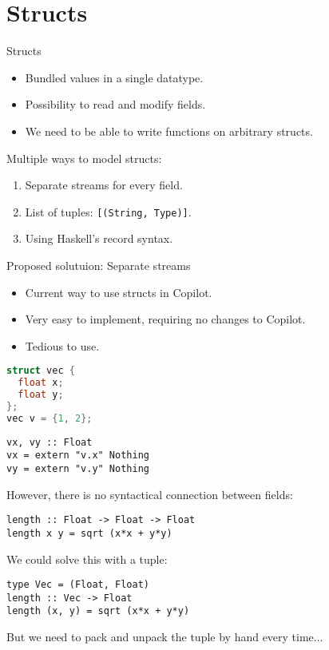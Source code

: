 \documentclass{beamer}
\begin{document}
\section{Structs}
\begin{frame}{Structs}
  \begin{itemize}
    \item Bundled values in a single datatype.
    \item Possibility to read and modify fields.
    \item We need to be able to write functions on arbitrary structs.
  \end{itemize}

  Multiple ways to model structs:
    \begin{enumerate}
      \item Separate streams for every field.
      \item List of tuples: \texttt{[(String, Type)]}.
      \item Using Haskell's record syntax.
    \end{enumerate}
\end{frame}



\begin{frame}[fragile]{Proposed solutuion: Separate streams}
  \begin{itemize}
    \item Current way to use structs in Copilot.
    \item Very easy to implement, requiring no changes to Copilot.
    \item Tedious to use.
  \end{itemize}
\begin{lstlisting}[language=c]
struct vec {
  float x;
  float y;
};
vec v = {1, 2};
\end{lstlisting}
\begin{lstlisting}
vx, vy :: Float
vx = extern "v.x" Nothing
vy = extern "v.y" Nothing
\end{lstlisting}
\end{frame}

\begin{frame}[fragile]
  However, there is no syntactical connection between fields:
\begin{lstlisting}
length :: Float -> Float -> Float
length x y = sqrt (x*x + y*y)
\end{lstlisting}

  We could solve this with a tuple:
\begin{lstlisting}
type Vec = (Float, Float)
length :: Vec -> Float
length (x, y) = sqrt (x*x + y*y)
\end{lstlisting}

  But we need to pack and unpack the tuple by hand every time...
\end{frame}
\end{document}
